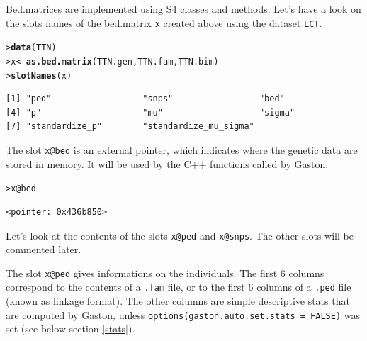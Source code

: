 \documentclass{article}\usepackage[]{graphicx}\usepackage[]{color}
\makeatletter
\newcommand{\hlopt}[1]{\textcolor[rgb]{0,0,0}{#1}}%
\newcommand{\hlstd}[1]{\textcolor[rgb]{0.345,0.345,0.345}{#1}}%
\newcommand{\hlkwb}[1]{\textcolor[rgb]{0.69,0.353,0.396}{#1}}%
\newcommand{\hlkwc}[1]{\textcolor[rgb]{0.333,0.667,0.333}{#1}}%
\newcommand{\hlkwd}[1]{\textcolor[rgb]{0.737,0.353,0.396}{\textbf{#1}}}%
\newenvironment{kframe}{%
 \def\at@end@of@kframe{}%
 \ifinner\ifhmode%
  \def\at@end@of@kframe{\end{minipage}}%
  \begin{minipage}{\columnwidth}%
 \fi\fi%
 \def\FrameCommand##1{\hskip\@totalleftmargin \hskip-\fboxsep
 \colorbox{shadecolor}{##1}\hskip-\fboxsep
     \hskip-\linewidth \hskip-\@totalleftmargin \hskip\columnwidth}%
 \MakeFramed {\advance\hsize-\width
   \@totalleftmargin\z@ \linewidth\hsize
   \@setminipage}}%
 {\par\unskip\endMakeFramed%
 \at@end@of@kframe}
\newenvironment{knitrout}{}{} %
\makeatother
\begin{document}
  Bed.matrices are implemented using S4 classes and methods.
  Let's have a look on the slots names of the bed.matrix \verb!x! created above using the dataset \verb!LCT!.

\begin{knitrout}
\color{fgcolor}\begin{kframe}
\begin{alltt}
\hlstd{> }\hlkwd{data}\hlstd{(TTN)}
\hlstd{> }\hlstd{x} \hlkwb{<-} \hlkwd{as.bed.matrix}\hlstd{(TTN.gen, TTN.fam, TTN.bim)}
\hlstd{> }\hlkwd{slotNames}\hlstd{(x)}
\end{alltt}
\begin{verbatim}
[1] "ped"                  "snps"                 "bed"                 
[4] "p"                    "mu"                   "sigma"               
[7] "standardize_p"        "standardize_mu_sigma"
\end{verbatim}
\end{kframe}
\end{knitrout}

  The slot \verb!x@bed! is an external pointer, which indicates where the genetic data are stored in
  memory. It will be used by the C++ functions called by Gaston. 
\begin{knitrout}
\color{fgcolor}\begin{kframe}
\begin{alltt}
\hlstd{> }\hlstd{x}\hlopt{@}\hlkwc{bed}
\end{alltt}
\begin{verbatim}
<pointer: 0x436b850>
\end{verbatim}
\end{kframe}
\end{knitrout}

  Let's look at the contents of the slots \verb!x@ped! and \verb!x@snps!.
  The other slots will be commented later.

  The slot \verb!x@ped! gives informations on the individuals. 
  The first 6 columns correspond to the contents of a \verb!.fam! file, or to the first 6 columns of a \verb!.ped! file 
  (known as linkage format). The other columns are simple descriptive
  stats that are computed by Gaston, unless \verb!options(gaston.auto.set.stats = FALSE)!
  was set (see below section \ref{stats}).
\end{document}
